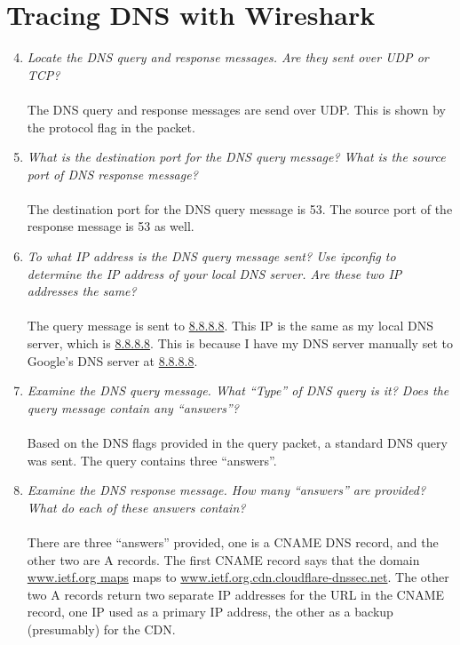 \documentclass[12pt]{article}
\begin{document}
\section{Tracing DNS with Wireshark}
\begin{enumerate}
		\setcounter{enumi}{3}
	\item{\textit{Locate the DNS query and response messages. Are they sent over UDP or TCP?}}\\ \\
		The DNS query and response messages are send over UDP. This is shown by the protocol flag in the packet.

	\item{ \textit{What is the destination port for the DNS query message? What is the source port of DNS response message?} }\\ \\
		The destination port for the DNS query message is 53. The source port of the response message is 53 as well.

	\item{\textit{To what IP address is the DNS query message sent? Use ipconfig to determine the IP address of your local DNS server. Are these two IP addresses the same?}}\\ \\
		The query message is sent to \url{8.8.8.8}. This IP is the same as my local DNS server, which is \url{8.8.8.8}. This is because I have my DNS server manually set to Google's DNS server at \url{8.8.8.8}.

	\item{\textit{Examine the DNS query message. What “Type” of DNS query is it? Does the query message contain any ``answers''?}}\\ \\
		Based on the DNS flags provided in the query packet, a standard DNS query was sent. The query contains three ``answers''.

	\item{\textit{Examine the DNS response message. How many “answers” are provided? What do each of these answers contain?}}\\ \\
		There are three ``answers'' provided, one is a CNAME DNS record, and the other two are A records. The first CNAME record says that the domain \url{www.ietf.org maps} maps to \url{www.ietf.org.cdn.cloudflare-dnssec.net}. The other two A records return two separate IP addresses for the URL in the CNAME record, one IP used as a primary IP address, the other as a backup (presumably) for the CDN.
 

\end{enumerate}
\end{document}
